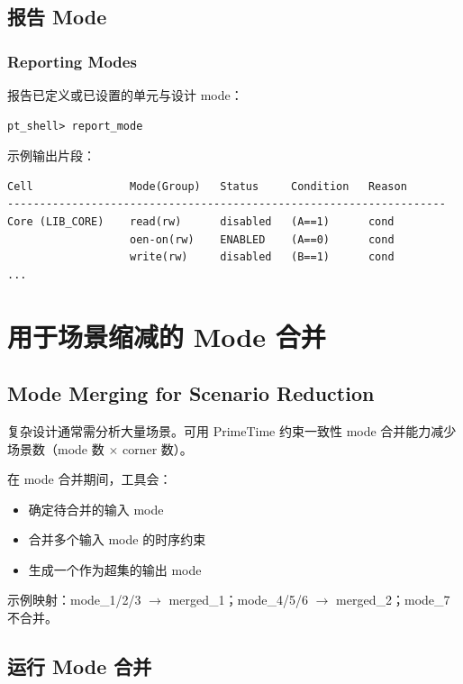 \subsection{报告 Mode}
\subsubsection*{Reporting Modes}

报告已定义或已设置的单元与设计 mode：
\begin{lstlisting}
pt_shell> report_mode
\end{lstlisting}

示例输出片段：
\begin{lstlisting}
Cell               Mode(Group)   Status     Condition   Reason
--------------------------------------------------------------------
Core (LIB_CORE)    read(rw)      disabled   (A==1)      cond
                   oen-on(rw)    ENABLED    (A==0)      cond
                   write(rw)     disabled   (B==1)      cond
...
\end{lstlisting}

\section{用于场景缩减的 Mode 合并}
\subsection*{Mode Merging for Scenario Reduction}

复杂设计通常需分析大量场景。可用 PrimeTime 约束一致性 mode 合并能力减少场景数（mode 数 $\times$ corner 数）。

在 mode 合并期间，工具会：
\begin{itemize}
  \item 确定待合并的输入 mode
  \item 合并多个输入 mode 的时序约束
  \item 生成一个作为超集的输出 mode
\end{itemize}


示例映射：mode\_1/2/3 $\rightarrow$ merged\_1；mode\_4/5/6 $\rightarrow$ merged\_2；mode\_7 不合并。

\subsection{运行 Mode 合并}
